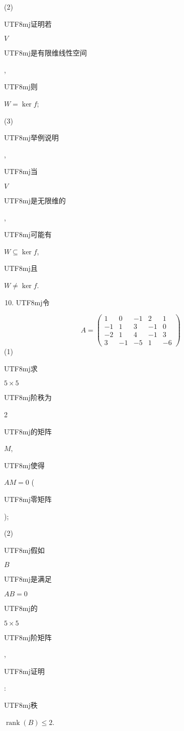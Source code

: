 \documentclass[10pt]{article}
\begin{document}
(2) \begin{CJK}{UTF8}{mj}证明若\end{CJK} $V$ \begin{CJK}{UTF8}{mj}是有限维线性空间\end{CJK}, \begin{CJK}{UTF8}{mj}则\end{CJK} $W=\operatorname{ker} f$;

(3) \begin{CJK}{UTF8}{mj}举例说明\end{CJK}, \begin{CJK}{UTF8}{mj}当\end{CJK} $V$ \begin{CJK}{UTF8}{mj}是无限维的\end{CJK}, \begin{CJK}{UTF8}{mj}可能有\end{CJK} $W \subseteq \operatorname{ker} f$, \begin{CJK}{UTF8}{mj}且\end{CJK} $W \neq \operatorname{ker} f$.

\begin{enumerate}
  \setcounter{enumi}{9}
  \item \begin{CJK}{UTF8}{mj}令\end{CJK}
\end{enumerate}
$$
A=\left(\begin{array}{ccccc}
1 & 0 & -1 & 2 & 1 \\
-1 & 1 & 3 & -1 & 0 \\
-2 & 1 & 4 & -1 & 3 \\
3 & -1 & -5 & 1 & -6
\end{array}\right)
$$
(1) \begin{CJK}{UTF8}{mj}求\end{CJK} $5 \times 5$ \begin{CJK}{UTF8}{mj}阶秩为\end{CJK} 2 \begin{CJK}{UTF8}{mj}的矩阵\end{CJK} $M$, \begin{CJK}{UTF8}{mj}使得\end{CJK} $A M=0$ (\begin{CJK}{UTF8}{mj}零矩阵\end{CJK});

(2) \begin{CJK}{UTF8}{mj}假如\end{CJK} $B$ \begin{CJK}{UTF8}{mj}是满足\end{CJK} $A B=0$ \begin{CJK}{UTF8}{mj}的\end{CJK} $5 \times 5$ \begin{CJK}{UTF8}{mj}阶矩阵\end{CJK}, \begin{CJK}{UTF8}{mj}证明\end{CJK}: \begin{CJK}{UTF8}{mj}秩\end{CJK} $\operatorname{rank}(B) \leqslant 2$.
\end{document}
